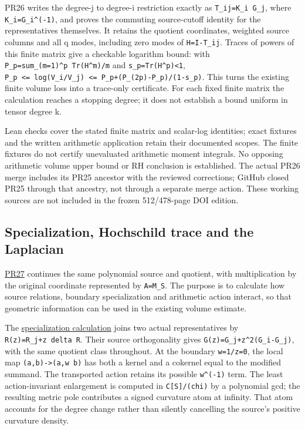 \documentclass[
]{article}
\begin{document}
PR26 writes the degree-j to degree-i restriction exactly as
\texttt{T\_ij=K\_i\ G\_j}, where \texttt{K\_i=G\_i\^{}(-1)}, and proves
the commuting source-cutoff identity for the representatives themselves.
It retains the quotient coordinates, weighted source columns and all q
modes, including zero modes of \texttt{H=I-T\_ij}. Traces of powers of
this finite matrix give a checkable logarithm bound: with
\texttt{P\_p=sum\_(m=1)\^{}p\ Tr(H\^{}m)/m} and
\texttt{s\_p=Tr(H\^{}p)\textless{}1},
\texttt{P\_p\ \textless{}=\ log(V\_i/V\_j)\ \textless{}=\ P\_p+(P\_(2p)-P\_p)/(1-s\_p)}.
This turns the existing finite volume loss into a trace-only
certificate. For each fixed finite matrix the calculation reaches a
stopping degree; it does not establish a bound uniform in tensor degree
k.

Lean checks cover the stated finite matrix and scalar-log identities;
exact fixtures and the written arithmetic application retain their
documented scopes. The finite fixtures do not certify unevaluated
arithmetic moment integrals. No opposing arithmetic volume upper bound
or RH conclusion is established. The actual PR26 merge includes its PR25
ancestor with the reviewed corrections; GitHub closed PR25 through that
ancestry, not through a separate merge action. These working sources are
not included in the frozen 512/478-page DOI edition.

\subsection{Specialization, Hochschild trace and the
Laplacian}\label{specialization-hochschild-trace-and-the-laplacian}

\href{https://github.com/KokunoYumeto/zeta-function-research-reader/pull/27}{PR27}
continues the same polynomial source and quotient, with multiplication
by the original coordinate represented by \texttt{A=M\_S}. The purpose
is to calculate how source relations, boundary specialization and
arithmetic action interact, so that geometric information can be used in
the existing volume estimate.

The
\href{https://github.com/KokunoYumeto/zeta-function-research-reader/blob/a4a87844c257485ae6d669f5b3eb6d96b9e8b8d8/workbenches/tau-specialization-curvature-formal/RESEARCH_NOTE.md}{specialization
calculation} joins two actual representatives by
\texttt{R(z)=R\_j+z\ delta\ R}. Their source orthogonality gives
\texttt{G(z)=G\_j+\textbar{}z\textbar{}\^{}2(G\_i-G\_j)}, with the same
quotient class throughout. At the boundary \texttt{w=1/z=0}, the local
map \texttt{(a,b)-\textgreater{}(a,w\ b)} has both a kernel and a
cokernel equal to the modified summand. The transported action retains
its possible \texttt{w\^{}(-1)} term. The least action-invariant
enlargement is computed in \texttt{C{[}S{]}/(chi)} by a polynomial gcd;
the resulting metric pole contributes a signed curvature atom at
infinity. That atom accounts for the degree change rather than silently
cancelling the source's positive curvature density.
\end{document}

